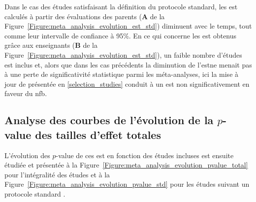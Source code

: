 \clearpage

Dans le cas des études satisfaisant la définition du protocole standard, les \gls{est} calculés à partir des évaluations des parents 
(\textbf{A} de la Figure~\ref{Figure:meta_analysis_evolution_est_std}) diminuent avec le temps, tout comme leur intervalle de confiance à 95\%. 
En ce qui concerne les \gls{est} obtenus grâce aux enseignants (\textbf{B} de la Figure~\ref{Figure:meta_analysis_evolution_est_std}), un faible nombre d'études 
est inclus et, alors que dans les cas précédents la diminution de l'\gls{est}ne menait pas à une perte de significativité statistique parmi les méta-analyses, 
ici la mise à jour de \citet{Cortese2016} présentée en \ref{selection_studies} conduit à un \gls{est} non significativement en faveur du \gls{nfb}. 

\subsection{Analyse des courbes de l'évolution de la $p$-value des tailles d'effet totales}

L'évolution des $p$-value de ces \gls{est} en fonction des études incluses est ensuite étudiée et présentée à la Figure~\ref{Figure:meta_analysis_evolution_pvalue_total} pour 
l'intégralité des études et à la Figure~\ref{Figure:meta_analysis_evolution_pvalue_std} pour les études suivant un protocole standard \citep{Arns2014}.

